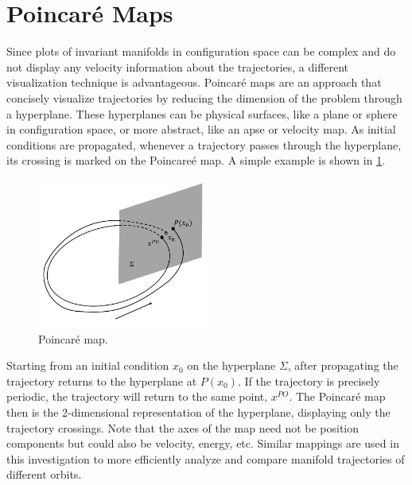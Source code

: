 \section{Poincar\'e Maps}
Since plots of invariant manifolds in configuration space can be complex and do not display any
velocity information about the trajectories, a different visualization technique is advantageous.
Poincar\'e maps are an approach that concisely visualize trajectories by reducing the dimension of
the problem through a hyperplane. These hyperplanes can be physical surfaces, like a plane or
sphere in configuration space, or more abstract, like an apse or velocity map. As initial
conditions are propagated, whenever a trajectory passes through the hyperplane, its crossing is
marked on the Poincare\'e map. A simple example is shown in \cref{fig:map}.

\begin{figure}[ht]
    \centering
    \includegraphics[width=0.5\textwidth]{figures/Map.jpg}
    \caption{Poincar\'e map.}
    \label{fig:map}
\end{figure}

Starting from an initial condition $x_{0}$ on the hyperplane $\Sigma$, after propagating the
trajectory returns to the hyperplane at $P(x_{0})$. If the trajectory is precisely periodic, the
trajectory will return to the same point, $x^{PO}$. The Poincar\'e map then is the 2-dimensional
representation of the hyperplane, displaying only the trajectory crossings. Note that the axes of
the map need not be position components but could also be velocity, energy, etc. Similar mappings
are used in this investigation to more efficiently analyze and compare manifold trajectories of
different orbits.
